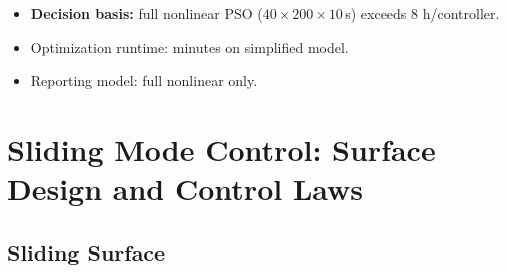 \documentclass[10pt, a4paper]{article}
\begin{document}
\begin{itemize}[leftmargin=1.5em,itemsep=0.2em]
  \item \textbf{Decision basis:} full nonlinear PSO
  ($40\times200\times10$\,s) exceeds 8 h/controller.
  \item Optimization runtime: minutes on simplified model.
  \item Reporting model: full nonlinear only.
\end{itemize}

\section{Sliding Mode Control: Surface Design and Control Laws}

\subsection{Sliding Surface}
\end{document}
